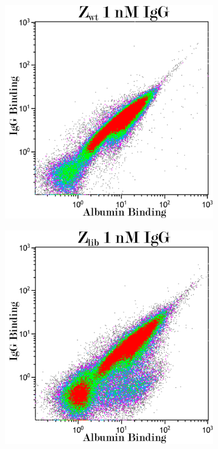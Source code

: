 \documentclass{article}
\begin{document}
\begin{multicols}{2}
\begin{figure}[H]
\begin{subfigure}{0.45\linewidth}
		\end{subfigure}\hspace{15mm}
		\begin{subfigure}{0.45\linewidth}
			\includegraphics[width=\linewidth]{images/flow_1_wt.png}
			\label{flow_21}
		\end{subfigure}
		\begin{subfigure}{0.45\linewidth}
			\includegraphics[width=\linewidth]{images/flow_1_lib.png}
			\label{flow_22}
		\end{subfigure}
	

\end{figure}
\end{multicols}
\end{document}
